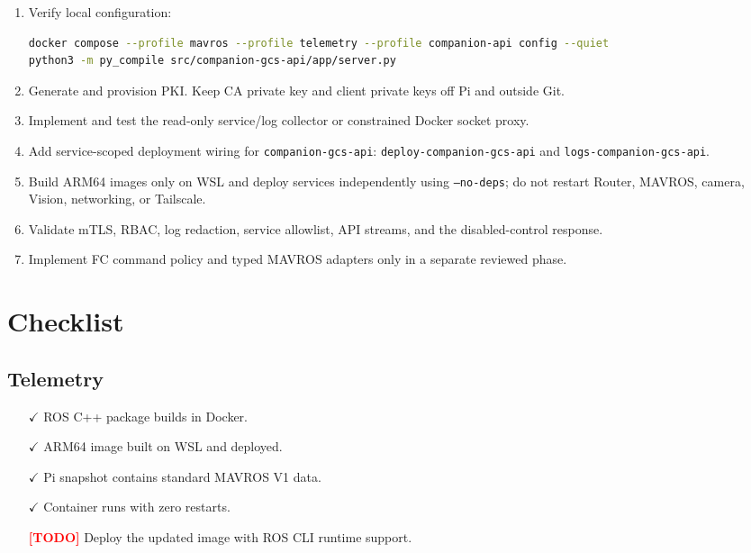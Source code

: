 \documentclass[11pt,a4paper]{article}
\newcommand{\pathtext}[1]{\texttt{#1}}
\newcommand{\todoitem}{\textcolor{red}{\textbf{[TODO]}}}
\begin{document}
\begin{enumerate}[label=\arabic*.]
  \item Verify local configuration:
\begin{lstlisting}[language=bash]
docker compose --profile mavros --profile telemetry --profile companion-api config --quiet
python3 -m py_compile src/companion-gcs-api/app/server.py
\end{lstlisting}
  \item Generate and provision PKI. Keep CA private key and client private keys
        off Pi and outside Git.
  \item Implement and test the read-only service/log collector or constrained
        Docker socket proxy.
  \item Add service-scoped deployment wiring for \pathtext{companion-gcs-api}:
        \pathtext{deploy-companion-gcs-api} and \pathtext{logs-companion-gcs-api}.
  \item Build ARM64 images only on WSL and deploy services independently using
        \pathtext{--no-deps}; do not restart Router, MAVROS, camera, Vision,
        networking, or Tailscale.
  \item Validate mTLS, RBAC, log redaction, service allowlist, API streams, and
        the disabled-control response.
  \item Implement FC command policy and typed MAVROS adapters only in a separate
        reviewed phase.
\end{enumerate}

\section{Checklist}

\subsection{Telemetry}
\begin{itemize}
  \item[$\checkmark$] ROS C++ package builds in Docker.
  \item[$\checkmark$] ARM64 image built on WSL and deployed.
  \item[$\checkmark$] Pi snapshot contains standard MAVROS V1 data.
  \item[$\checkmark$] Container runs with zero restarts.
  \item[\todoitem] Deploy the updated image with ROS CLI runtime support.
\end{itemize}
\end{document}
